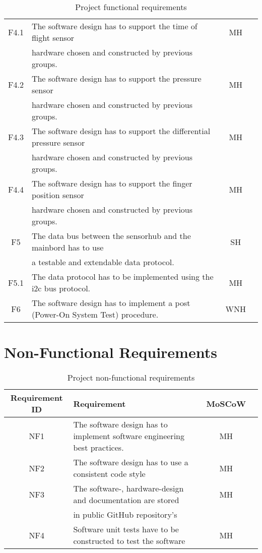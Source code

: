 \begin{table}[hb!]
\begin{tabular}{ |c|l|c|c| }
 \hline
 F4.1  & The software design has to support the time of flight sensor & MH \\
       & hardware chosen and constructed by previous groups. & \\
\hline
 F4.2  & The software design has to support the pressure sensor & MH \\
       & hardware chosen and constructed by previous groups. & \\
\hline
 F4.3  & The software design has to support the differential pressure sensor & MH \\
       & hardware chosen and constructed by previous groups. & \\
\hline
 F4.4  & The software design has to support the finger position sensor & MH \\
       & hardware chosen and constructed by previous groups. & \\
\hline
 F5    & The data bus between the sensorhub and the mainbord has to use & SH\\
       & a testable and extendable data protocol. &   \\
 \hline
 F5.1  & The data protocol has to be implemented using the i2c bus protocol. & MH \\
 \hline
 F6    & The software design has to implement a post (Power-On System Test) procedure. & WNH \\ 
 \hline
\end{tabular}
 \caption{Project functional requirements}
 \label{tab:functional_requirements}
\end{table}
\section{Non-Functional Requirements}
\begin{table}[!hb]
\begin{tabular}{ |c|l|c|c| } 
 \hline
 Requirement ID & Requirement & MoSCoW \\ 
 \hline
 \hline
 NF1    & The software design has to implement software engineering best practices.  & MH \\
 \hline
 NF2    & The software design has to use a consistent code style & MH \\
 \hline 
 NF3    & The software-, hardware-design and documentation are stored  & MH \\
        & in public GitHub repository's & \\
\hline
 NF4   & Software unit tests have to be constructed to test the software & MH\\
 \hline
\end{tabular}
 \caption{Project non-functional requirements}
 \label{tab:non_functional_requirements}
\end{table}
